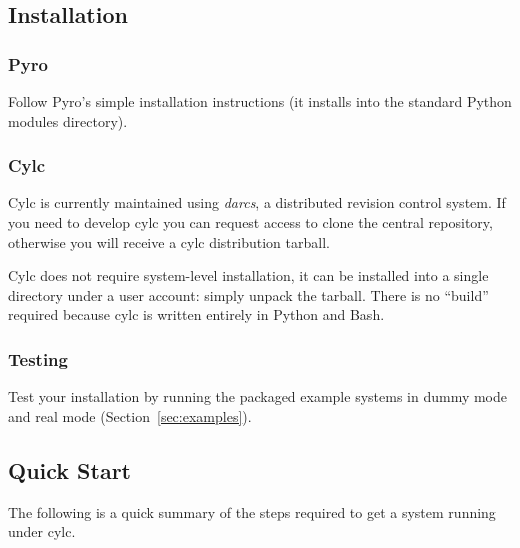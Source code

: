 \documentclass[11pt,a4paper]{article}
\begin{document}
\subsection{Installation}

\subsubsection{Pyro}

Follow Pyro's simple installation instructions (it installs into the
standard Python modules directory).

\subsubsection{Cylc}

Cylc is currently maintained using {\em darcs}, a distributed revision
control system. If you need to develop cylc you can request access to
clone the central repository, otherwise you will receive a cylc
distribution tarball.

Cylc does not require system-level installation, it can be installed
into a single directory under a user account: simply unpack the
tarball. There is no ``build'' required because cylc is written entirely 
in Python and Bash.

\subsubsection{Testing}

Test your installation by running the packaged example systems in dummy
mode and real mode (Section~\ref{sec:examples}).

\pagebreak
\subsection{Quick Start}

The following is a quick summary of the steps required to get a system
running under cylc.
\end{document}
